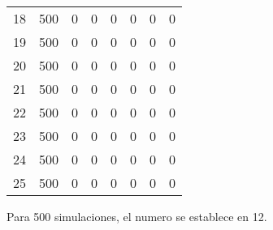 \begin{table}[h]
{\begin{tabular}{|c|c|c|c|c|c|c|c|}
18 & 500 & 0 & 0 & 0 & 0 & 0 & 0 \\
19 & 500 & 0 & 0 & 0 & 0 & 0 & 0 \\
20 & 500 & 0 & 0 & 0 & 0 & 0 & 0 \\
21 & 500 & 0 & 0 & 0 & 0 & 0 & 0 \\
22 & 500 & 0 & 0 & 0 & 0 & 0 & 0 \\
23 & 500 & 0 & 0 & 0 & 0 & 0 & 0 \\
24 & 500 & 0 & 0 & 0 & 0 & 0 & 0 \\
25 & 500 & 0 & 0 & 0 & 0 & 0 & 0 \\ \hline
\end{tabular}%
}
\end{table}

Para 500 simulaciones, el numero se establece en 12.

